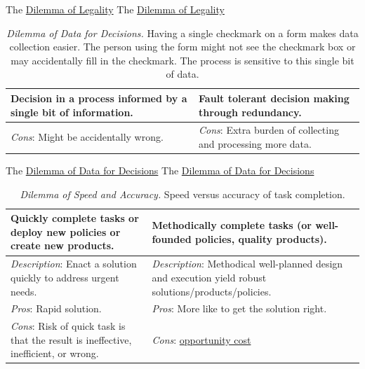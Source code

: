 The \href{table:legality}{Dilemma of Legality}
The \href{table:legality}{Dilemma of Legality}


\begin{center}
\begin{table}[H] %
\begin{tabular}{ | m{\dilemmatablewidth}| m{\dilemmatablewidth} | } 
  \hline
  \textbf{Decision in a process informed by a single bit of information.} & 
  \textbf{Fault tolerant decision making through redundancy.} \\ 
  \hline
  \textit{Cons}: Might be accidentally wrong. &
  \textit{Cons}: Extra burden of collecting and processing more data. \\  
  \hline
\end{tabular}
\caption{
\textit{Dilemma of Data for Decisions.}
Having a single checkmark on a form makes data collection easier. The person using the form might not see the checkmark box or may accidentally fill in the checkmark. The process is sensitive to this single bit of data.
}
\label{table:single-bit-decision}
\end{table}
\end{center}

The \href{table:single-bit-decision}{Dilemma of Data for Decisions}
The \href{table:single-bit-decision}{Dilemma of Data for Decisions}

\begin{center}
\begin{table}[H] %
\begin{tabular}{ | m{\dilemmatablewidth}| m{\dilemmatablewidth} | } 
  \hline
  \textbf{Quickly complete tasks or deploy new policies or create new products.} & 
  \textbf{Methodically complete tasks (or well-founded policies, quality products).} \\ 
  \hline
  \textit{Description}: Enact a solution quickly to address urgent needs. &
  \textit{Description}: Methodical well-planned design and execution yield robust solutions/products/policies. \\
  \hline
  \textit{Pros}: Rapid solution. &
  \textit{Pros}: More like to get the solution right. \\
  \hline
  \textit{Cons}: Risk of quick task is that the result is ineffective, inefficient, or wrong. &
  \textit{Cons}: \href{https://en.wikipedia.org/wiki/Opportunity_cost}{opportunity cost} \\  
  \hline
\end{tabular}
\caption{
\textit{Dilemma of Speed and Accuracy.}
Speed versus accuracy of task completion.
}
\label{table:quick-methodical}
\end{table}
\end{center}

